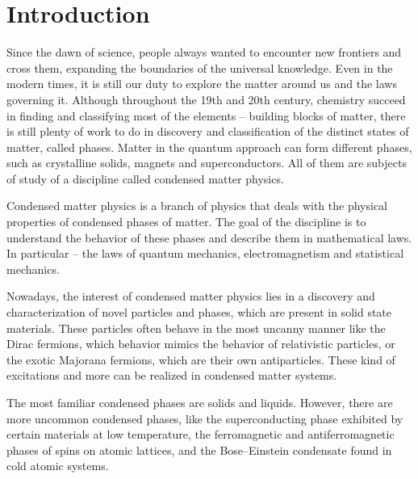 \documentclass[titlepage,a4paper]{book}
\newcommand{\wciecie}{\quad\phantom{v}}
\begin{document}
\newcommand{\HRule}{\rule{\linewidth}{0.5mm}}



\newpage
\large
\thispagestyle{empty}
\tableofcontents


\newpage

\chapter{Introduction}
\wciecie
Since the dawn of science, people always wanted to encounter new frontiers and cross them, expanding the boundaries of the universal knowledge. Even in the modern times, it is still our duty to explore the matter around us and the laws governing it. Although throughout the 19th  and 20th century, chemistry succeed in finding and classifying most of the elements -- building blocks of matter, there is still plenty of work to do in discovery and classification of the distinct states of matter, called phases. Matter in the quantum approach can form different phases, such as crystalline solids, magnets and superconductors. All of them are subjects of study of a discipline called condensed matter physics. 

Condensed matter physics is a branch of physics that deals with the physical properties of condensed phases of matter. The goal of the discipline is to understand the behavior of these phases and describe them in mathematical laws. In particular -- the laws of quantum mechanics, electromagnetism and statistical mechanics.

Nowadays, the interest of condensed matter physics lies in a discovery and characterization of novel particles and phases, which are present in solid state materials. These particles often behave in the most uncanny manner like the Dirac fermions, which behavior mimics the behavior of relativistic particles, or the exotic Majorana fermions, which are their own antiparticles. These kind of excitations and more can be realized in condensed matter systems.

The most familiar condensed phases are solids and liquids. However, there are more uncommon condensed phases, like the superconducting phase exhibited by certain materials at low temperature, the ferromagnetic and antiferromagnetic phases of spins on atomic lattices, and the Bose–Einstein condensate found in cold atomic systems.
\end{document}
